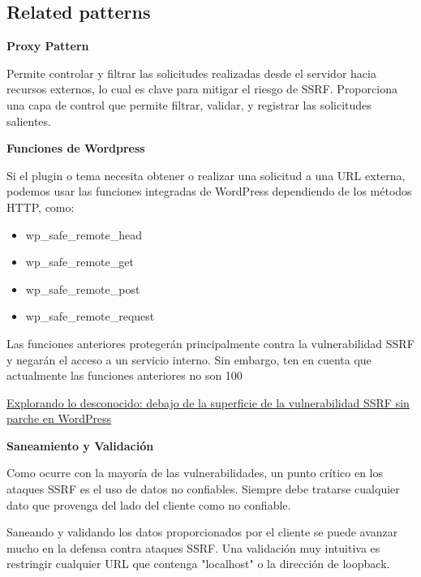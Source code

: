 \subsection{Related patterns}

\textbf{Proxy Pattern} 

Permite controlar y filtrar las solicitudes realizadas desde el servidor hacia recursos externos, lo cual es clave para mitigar el riesgo de SSRF. Proporciona una capa de control que permite filtrar, validar, y registrar las solicitudes salientes.

\textbf{Funciones de Wordpress} 

Si el plugin o tema necesita obtener o realizar una solicitud a una URL externa, podemos usar las funciones integradas de WordPress dependiendo de los métodos HTTP, como: 

\begin{itemize}
    \item wp\_safe\_remote\_head
    \item wp\_safe\_remote\_get
    \item wp\_safe\_remote\_post
    \item wp\_safe\_remote\_request
\end{itemize}

Las funciones anteriores protegerán principalmente contra la vulnerabilidad SSRF y negarán el acceso a un servicio interno. Sin embargo, ten en cuenta que actualmente las funciones anteriores no son 100%

\href{https://patchstack.com/articles/exploring-the-unpatched-wordpress-ssrf/}{Explorando lo desconocido: debajo de la superficie de la vulnerabilidad SSRF sin parche en WordPress} 

\textbf{Saneamiento y Validación} 

Como ocurre con la mayoría de las vulnerabilidades, un punto crítico en los ataques SSRF es el uso de datos no confiables. Siempre debe tratarse cualquier dato que provenga del lado del cliente como no confiable.

Saneando y validando los datos proporcionados por el cliente se puede avanzar mucho en la defensa contra ataques SSRF. Una validación muy intuitiva es restringir cualquier URL que contenga "localhost" o la dirección de loopback.


